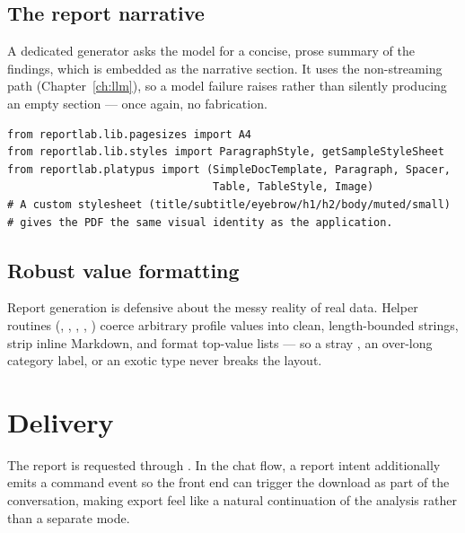 \subsection{The report narrative}
A dedicated  generator asks the model for a concise,
prose summary of the findings, which is embedded as the narrative section. It
uses the non-streaming  path (Chapter~\ref{ch:llm}), so a
model failure raises rather than silently producing an empty section --- once
again, no fabrication.

\begin{lstlisting}[style=py,caption={ReportLab flowables used to build the document.}]
from reportlab.lib.pagesizes import A4
from reportlab.lib.styles import ParagraphStyle, getSampleStyleSheet
from reportlab.platypus import (SimpleDocTemplate, Paragraph, Spacer,
                                Table, TableStyle, Image)
# A custom stylesheet (title/subtitle/eyebrow/h1/h2/body/muted/small)
# gives the PDF the same visual identity as the application.
\end{lstlisting}

\subsection{Robust value formatting}
Report generation is defensive about the messy reality of real data. Helper
routines (, , ,
, ) coerce arbitrary profile
values into clean, length-bounded strings, strip inline Markdown, and format
top-value lists --- so a stray , an over-long category label, or an
exotic type never breaks the layout.

\section{Delivery}
The report is requested through . In the chat flow, a
report intent additionally emits a  command event so the
front end can trigger the download as part of the conversation, making export
feel like a natural continuation of the analysis rather than a separate mode.
